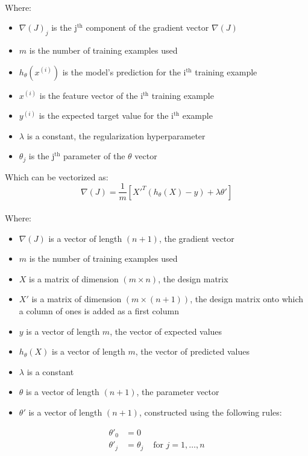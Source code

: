 \\
Where:  
\begin{itemize}
    \item $\nabla(J)_j$ is the j$^\text{th}$ component of the gradient vector $\nabla(J)$
    \item $m$ is the number of training examples used
    \item $h_\theta(x^{(i)})$ is the model's prediction for the i$^\text{th}$ training example
    \item $x^{(i)}$ is the feature vector of the i$^\text{th}$ training example
    \item $y^{(i)}$ is the expected target value for the i$^\text{th}$ example
    \item $\lambda$ is a constant, the regularization hyperparameter
    \item $\theta_j$ is the j$^\text{th}$ parameter of the $\theta$ vector
\end{itemize}
\bigskip
Which can be vectorized as:
$$
\nabla(J) = \frac{1}{m} [X'^T(h_\theta(X) - y) + \lambda \theta']
$$  
\\
Where:  
\begin{itemize}
    \item $\nabla(J)$ is a vector of length $(n + 1)$, the gradient vector
    \item $m$ is the number of training examples used
    \item $X$ is a matrix of dimension $(m \times n)$, the design matrix
    \item $X'$ is a matrix of dimension $(m \times (n + 1))$, the design matrix onto 
    which a column of ones is added as a first column
    \item $y$ is a vector of length $m$, the vector of expected values
    \item $h_\theta(X)$ is a vector of length $m$, the vector of predicted values
    \item $\lambda$ is a constant
    \item $\theta$ is a vector of length $(n + 1)$, the parameter vector
    \item $\theta'$ is a vector of length $(n + 1)$, constructed using the following rules:
\end{itemize}

$$
\begin{matrix}
\theta'_0 & =  0 \\
\theta'_j & =  \theta_j & \text{ for } j = 1, \dots, n\\    
\end{matrix}
$$

